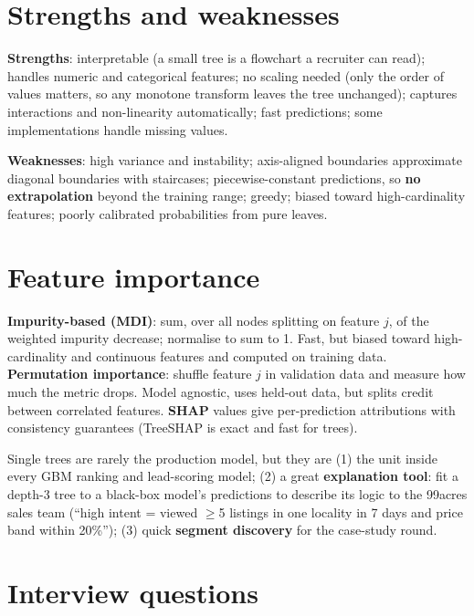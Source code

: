 \section{Strengths and weaknesses}
\textbf{Strengths}: interpretable (a small tree is a flowchart a recruiter can read); handles numeric and categorical
features; no scaling needed (only the order of values matters, so any monotone transform leaves the tree unchanged);
captures interactions and non-linearity automatically; fast predictions; some implementations handle missing values.

\textbf{Weaknesses}: high variance and instability; axis-aligned boundaries approximate diagonal boundaries with
staircases; piecewise-constant predictions, so \textbf{no extrapolation} beyond the training range; greedy; biased
toward high-cardinality features; poorly calibrated probabilities from pure leaves.

\section{Feature importance}
\textbf{Impurity-based (MDI)}: sum, over all nodes splitting on feature $j$, of the weighted impurity decrease; normalise
to sum to 1. Fast, but biased toward high-cardinality and continuous features and computed on training data.
\textbf{Permutation importance}: shuffle feature $j$ in validation data and measure how much the metric drops. Model
agnostic, uses held-out data, but splits credit between correlated features. \textbf{SHAP} values give per-prediction
attributions with consistency guarantees (TreeSHAP is exact and fast for trees).

\begin{practical}
Single trees are rarely the production model, but they are (1) the unit inside every GBM ranking and lead-scoring model;
(2) a great \textbf{explanation tool}: fit a depth-3 tree to a black-box model's predictions to describe its logic to the
99acres sales team (``high intent = viewed $\ge$5 listings in one locality in 7 days and price band within 20\%'');
(3) quick \textbf{segment discovery} for the case-study round.
\end{practical}

\section{Interview questions}

